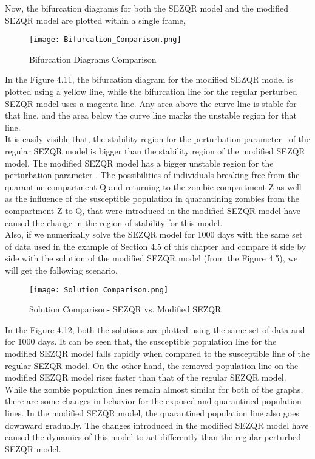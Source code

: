 Now, the bifurcation diagrams for both the SEZQR model and the modified SEZQR model are plotted within a single frame, \\

\begin{figure}[H]
\centering
\texttt{[image: Bifurcation\_Comparison.png]}
\caption{Bifurcation Diagrams Comparison}
\label{fig:Bifurcation Comparison}
\end{figure}

In the Figure 4.11, the bifurcation diagram for the modified SEZQR model is plotted using a yellow line, while the bifurcation line for the regular perturbed SEZQR model uses a magenta line. Any area above the curve line is stable for that line, and the area below the curve line marks the unstable region for that line. \\

It is easily visible that, the stability region for the perturbation parameter \textmu \ of the regular SEZQR model is bigger than the stability region of the modified SEZQR model. The modified SEZQR model has a bigger unstable region for the perturbation parameter \textmu. The possibilities of individuals breaking free from the quarantine compartment Q and returning to the zombie compartment Z as well as the influence of the susceptible population in quarantining zombies from the compartment Z to Q, that were introduced in the modified SEZQR model have caused the change in the region of stability for this model. \\

Also, if we numerically solve the SEZQR model for 1000 days with the same set of data used in the example of Section 4.5 of this chapter and compare it side by side with the solution of the modified SEZQR model (from the Figure 4.5), we will get the following scenario, \\

\begin{figure}[H]
\centering
\texttt{[image: Solution\_Comparison.png]}
\caption{Solution Comparison- SEZQR vs. Modified SEZQR}
\label{fig:Solution Comparison}
\end{figure}

In the Figure 4.12, both the solutions are plotted using the same set of data and for 1000 days. It can be seen that, the susceptible population line for the modified SEZQR model falls rapidly when compared to the susceptible line of the regular SEZQR model. On the other hand, the removed population line on the modified SEZQR model rises faster than that of the regular SEZQR model. While the zombie population lines remain almost similar for both of the graphs, there are some changes in behavior for the exposed and quarantined population lines. In the modified SEZQR model, the quarantined population line also goes downward gradually. The changes introduced in the modified SEZQR model have caused the dynamics of this model to act differently than the regular perturbed SEZQR model. \\

